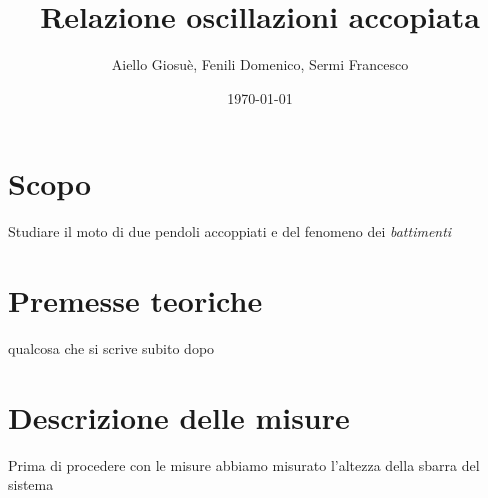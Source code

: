 \documentclass{article}
\title{Relazione oscillazioni accopiata}
\author{Aiello Giosuè, Fenili Domenico, Sermi Francesco}
\date{\today}
\begin{document}
\maketitle
\newpage
\tableofcontents
\section{Scopo}
Studiare il moto di due pendoli accoppiati e del fenomeno dei \emph{battimenti}
\section{Premesse teoriche}
qualcosa che si scrive subito dopo

\section{Descrizione delle misure}

Prima di procedere con le misure abbiamo misurato l'altezza della sbarra del sistema
\end{document}
